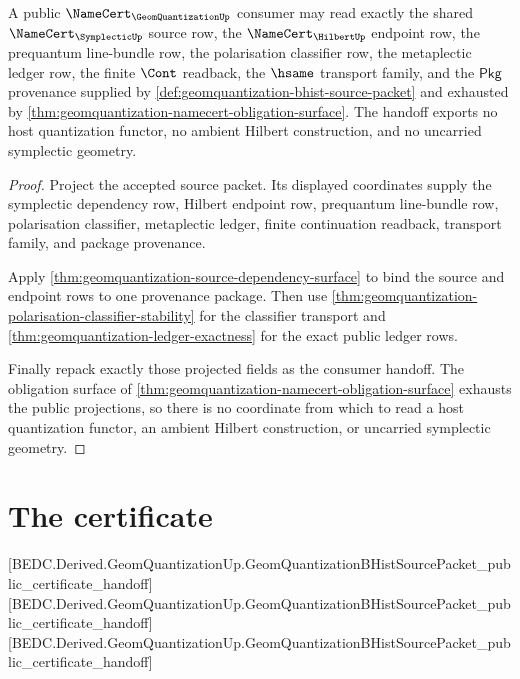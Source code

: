 \begin{theorem}
\label{thm:geomquantization-public-certificate-handoff}
A public $\NameCert_{\GeomQuantizationUp}$ consumer may read exactly the shared
$\NameCert_{\SymplecticUp}$ source row, the $\NameCert_{\HilbertUp}$ endpoint
row, the prequantum line-bundle row, the polarisation classifier row, the
metaplectic ledger row, the finite $\Cont$ readback, the $\hsame$ transport
family, and the $\mathsf{Pkg}$ provenance supplied by
\autoref{def:geomquantization-bhist-source-packet} and exhausted by
\autoref{thm:geomquantization-namecert-obligation-surface}. The handoff exports
no host quantization functor, no ambient Hilbert construction, and no
uncarried symplectic geometry.
\end{theorem}
\begin{proof}
Project the accepted source packet. Its displayed coordinates supply the
symplectic dependency row, Hilbert endpoint row, prequantum line-bundle row,
polarisation classifier, metaplectic ledger, finite continuation readback,
transport family, and package provenance.

Apply \autoref{thm:geomquantization-source-dependency-surface} to bind the
source and endpoint rows to one provenance package. Then use
\autoref{thm:geomquantization-polarisation-classifier-stability} for the
classifier transport and \autoref{thm:geomquantization-ledger-exactness} for
the exact public ledger rows.

Finally repack exactly those projected fields as the consumer handoff. The
obligation surface of \autoref{thm:geomquantization-namecert-obligation-surface}
exhausts the public projections, so there is no coordinate from which to read a
host quantization functor, an ambient Hilbert construction, or uncarried
symplectic geometry.
\end{proof}

\section{The certificate}
\label{sec:geomquantization-certificate}

[BEDC.Derived.GeomQuantizationUp.GeomQuantizationBHistSourcePacket\_public\_certificate\_handoff]
[BEDC.Derived.GeomQuantizationUp.GeomQuantizationBHistSourcePacket\_public\_certificate\_handoff]
[BEDC.Derived.GeomQuantizationUp.GeomQuantizationBHistSourcePacket\_public\_certificate\_handoff]

